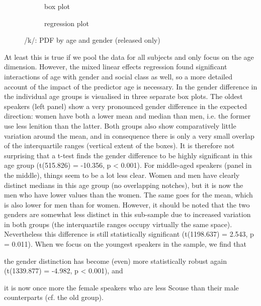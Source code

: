 \begin{figure}[h]
	\centering
	\begin{subfigure}{.49\textwidth}
		\centering
			\resizebox{\linewidth}{!}{} 
		\caption{box plot}
		\label{fig.box.k.agegender}
	\end{subfigure}
	\begin{subfigure}{.49\textwidth}
		\centering
			\resizebox{\linewidth}{!}{}
		\caption{regression plot}
		\label{fig.scatter.k.agegender}
	\end{subfigure}
	\caption{/k/: PDF by age and gender (released only)}
\end{figure}

At least this is true if we pool the data for all subjects and only focus on the age dimension.
However, the mixed linear effects regression found significant interactions of age with gender and social class as well, so a more detailed account of the impact of the predictor age is necessary.
In  the gender difference in the individual age groups is visualised in three separate box plots.
The oldest speakers (left panel) show a very pronounced gender difference in the expected direction: women have both a lower mean and median than men, i.e. the former use less lenition than the latter.
Both groups also show comparatively little variation around the mean, and in consequence there is only a very small overlap of the interquartile ranges (vertical extent of the boxes).
It is therefore not surprising that a t-test finds the gender difference to be highly significant in this age group (t(515.826) = -10.356, p < 0.001).
For middle-aged speakers (panel in the middle), things seem to be a lot less clear.
Women and men have clearly distinct medians in this age group (no overlapping notches), but it is now the men who have lower  values than the women.
The same goes for the mean, which is also lower for men than for women.
However, it should be noted that the two genders are somewhat less distinct in this sub-sample due to increased variation in both groups (the interquartile ranges occupy virtually the same space).
Nevertheless this difference is still statistically significant (t(1198.637) = 2.543, p = 0.011).
When we focus on the youngest speakers in the sample, we find that
\begin{inparaenum}[(a)]
	\item the gender distinction has become (even) more statistically robust again (t(1339.877) = -4.982, p < 0.001), and
	\item it is now once more the female speakers who are less Scouse than their male counterparts (cf. the old group).
\end{inparaenum}

